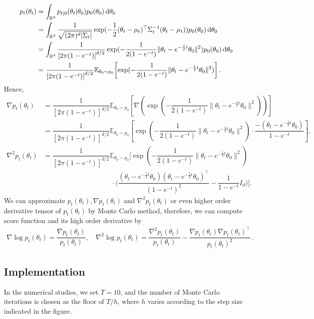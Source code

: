 \begin{align*}
	p_t(\theta_t)&=\int_{\mathbb{R}^d}p_{t|0}(\theta_t|\theta_0)p_0(\theta_0)\rmd \theta_0\\
	&=\int_{\mathbb{R}^d}\dfrac{1}{\sqrt{(2\pi)^d|\Sigma_t|}}\exp(-\dfrac{1}{2}(\theta_t-\mu_t)^\top\Sigma_t^{-1}(\theta_t-\mu_t))p_0(\theta_0)\rmd \theta_0\\
	&=\int_{\mathbb{R}^d}\dfrac{1}{\left[2\pi(1-e^{-t})\right]^{d/2}}\exp(-\dfrac{1}{2(1-e^{-t})}\|\theta_t-e^{-\frac{1}{2}t}\theta_0\|^2)p_0(\theta_0)\rmd \theta_0\\
	&=\dfrac{1}{\left[2\pi(1-e^{-t})\right]^{d/2}}\mathbb{E}_{\theta_0\sim p_0}\left[\exp(-\dfrac{1}{2(1-e^{-t})}\|\theta_t-e^{-\frac{1}{2}t}\theta_0\|^2)\right]\,.
\end{align*}
Hence,
\begin{align*}
	\nabla p_t(\theta_t)&=\dfrac{1}{\left[2\pi(1-e^{-t})\right]^{d/2}}\mathbb{E}_{\theta_0\sim p_0}\left[\nabla\left(\exp(-\dfrac{1}{2(1-e^{-t})}\|\theta_t-e^{-\frac{1}{2}t}\theta_0\|^2)\right)\right]\\
	&=\dfrac{1}{\left[2\pi(1-e^{-t})\right]^{d/2}}\mathbb{E}_{\theta_0\sim p_0}\left[\exp(-\dfrac{1}{2(1-e^{-t})}\|\theta_t-e^{-\frac{1}{2}t}\theta_0\|^2)\cdot\dfrac{-(\theta_t-e^{-\frac{1}{2}t}\theta_0)}{1-e^{-t}}\right],\\
	\nabla^2 p_t(\theta_t)&=\dfrac{1}{\left[2\pi(1-e^{-t})\right]^{d/2}}\mathbb{E}_{\theta_0\sim p_0}\bigg[\exp(-\dfrac{1}{2(1-e^{-t})}\|\theta_t-e^{-\frac{1}{2}t}\theta_0\|^2)\\
    &\qquad\qquad\qquad\qquad\qquad\cdot\bigg(\dfrac{(\theta_t-e^{-\frac{1}{2}t}\theta_0)(\theta_t-e^{-\frac{1}{2}t}\theta_0)^\top}{(1-e^{-t})^2}-\dfrac{1}{1-e^{-t}}I_d\bigg)\bigg].
\end{align*}
We can approximate $p_t(\theta_t),\nabla p_t(\theta_t)$ and $\nabla^2 p_t(\theta_t)$ or even higher order derivative tensor of $p_t(\theta_t)$ by Monte Carlo method, therefore, we can compute score function and its high order derivative by
\begin{align*}
	\nabla\log p_t(\theta_t)=\dfrac{\nabla p_t(\theta_t)}{p_t(\theta_t)},\quad \nabla^2\log p_t(\theta_t)=\dfrac{\nabla^2 p_t(\theta_t)}{p_t(\theta_t)}-\dfrac{\nabla p_t(\theta_t)\nabla p_t(\theta_t)^\top}{p_t(\theta_t)^2}\,.
\end{align*}

\subsection{Implementation}
In the numerical studies, we set $T=10$, and the number of Monte Carlo iterations is chosen as the floor of $T/h$, where $h$ varies according to the step size indicated in the figure.

